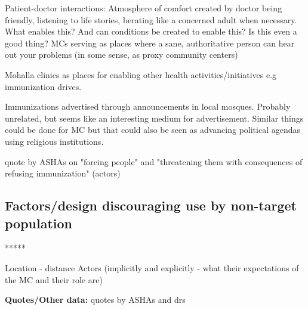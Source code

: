 Patient-doctor interactions: Atmosphere of comfort created by doctor being friendly, listening to life stories, berating like a concerned adult when necessary. What enables this? And can conditions be created to enable this? Is this even a good thing? MCs serving as places where a sane, authoritative person can hear out your problems (in some sense, as proxy community centers)

Mohalla clinics as places for enabling other health activities/initiatives e.g immunization drives.

Immunizations advertised through announcements in local mosques. Probably unrelated, but seems like an interesting medium for advertisement. Similar things could be done for MC but that could also be seen as advancing political agendas using religious institutions.

quote by ASHAs on "forcing people" and "threatening them with consequences of refusing immunization" (actors)

\subsection{Factors/design discouraging use by non-target population}

*****

Location - distance
Actors (implicitly and explicitly - what their expectations of the MC and their role are)

\textbf{Quotes/Other data:}
quotes by ASHAs and drs